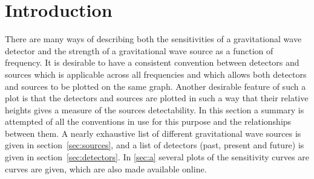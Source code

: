 \section{Introduction}


There are many ways of describing both the sensitivities of a gravitational wave detector and the strength of a gravitational wave source as a function of frequency. It is desirable to have a consistent convention between detectors and sources which is applicable across all frequencies and which allows both detectors and sources to be plotted on the same graph. Another desirable feature of such a plot is that the detectors and sources are plotted in such a way that their relative heights gives a measure of the sources detectability. In this section a summary is attempted of all the conventions in use for this purpose and the relationships between them. A nearly exhaustive list of different gravitational wave sources is given in section~\ref{sec:sources}, and a list of detectors (past, present and future) is given in section~\ref{sec:detectors}. In \ref{sec:a} several plots of the sensitivity curves are curves are given, which are also made available online.

